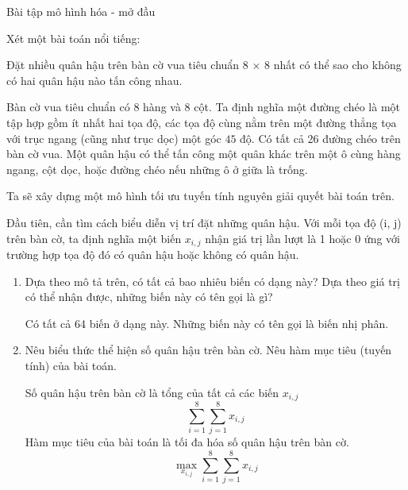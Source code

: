 \begin{exercise}{3}{Bài tập mô hình hóa - mở đầu}

    Xét một bài toán nổi tiếng:

    \begin{problem}{10}
        Đặt nhiều quân hậu trên bàn cờ vua tiêu chuẩn 8 × 8 nhất có thể sao cho
không có hai quân hậu nào tấn công nhau.
    \end{problem}
    \begin{solution}
    Bàn cờ vua tiêu chuẩn có 8 hàng và 8 cột. Ta định nghĩa một đường chéo là một tập hợp gồm ít
    nhất hai tọa độ, các tọa độ cùng nằm trên một đường thẳng tọa với trục ngang (cũng như trục
    dọc) một góc $45$ độ. Có tất cả 26 đường chéo trên bàn cờ vua. Một quân hậu có thể tấn công
    một quân khác trên một ô cùng hàng ngang, cột dọc, hoặc đường chéo nếu những ô ở giữa là trống.

    Ta sẽ xây dựng một mô hình tối ưu tuyến tính nguyên giải quyết bài toán trên.

    Đầu tiên, cần tìm cách biểu diễn vị trí đặt những quân hậu. Với mỗi tọa độ (i, j) trên bàn cờ,
ta định nghĩa một biến $x_{i,j}$ nhận giá trị lần lượt là 1 hoặc 0 ứng với trường hợp tọa độ đó có
quân hậu hoặc không có quân hậu.
\begin{enumerate}[label=(\alph*)]
    \item Dựa theo mô tả trên, có tất cả bao nhiêu biến có dạng này? Dựa theo giá trị có thể nhận
    được, những biến này có tên gọi là gì?
    \begin{answer}
        Có tất cả 64 biến ở dạng này.
        Những biến này có tên gọi là biến nhị phân.
    \end{answer}
    \item  Nêu biểu thức thể hiện số quân hậu trên bàn cờ. Nêu hàm mục tiêu (tuyến tính) của bài
    toán.
    \begin{answer}
        Số quân hậu trên bàn cờ là tổng của tất cả các biến $x_{i,j}$
        \begin{equation*}
            \sum_{i=1}^8\sum_{j=1}^8 x_{i,j}
        \end{equation*}
        Hàm mục tiêu của bài toán là tối đa hóa số quân hậu trên bàn cờ.
        \begin{equation*}
          \max_{x_{i,j}}\sum_{i=1}^8\sum_{j=1}^8 x_{i,j}
        \end{equation*}
    \end{answer}


\end{enumerate}
\end{solution}
\end{exercise}
